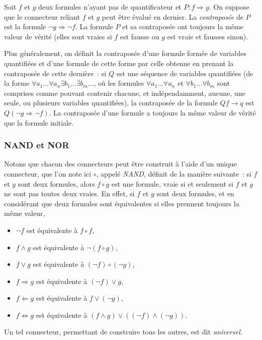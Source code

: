 Soit $f$ et $g$ deux formules n'ayant pas de quantificateur et $P: f \Rightarrow g$. 
On suppose que le connecteur reliant $f$ et $g$ peut être évalué en dernier.
La \textit{contraposée} de $P$ est la formule $\neg g \Rightarrow \neg f$. 
La formule $P$ et sa contraposée ont toujours la même valeur de vérité (elles sont vraies si $f$ est fausse ou $g$ est vraie et fausses sinon). 

Plus généralement, on définit la contraposée d'une formule formée de variables quantifiées et d'une formule de cette forme par celle obtenue en prenant la contraposée de cette dernière : si $Q$ est une séquence de variables quantifiées (de la forme $\forall a_1 \dots \forall a_n \exists b_1 \dots \exists b_m \dots$, où les formules $\forall a_1 \dots \forall a_n$ et $\forall b_1 \dots \forall b_m$ sont comprises comme pouvant contenir chacune, et indépendamment, aucune, une seule, ou plusieurs variables quantifiées), la contraposée de la formule $Q f \rightarrow q$ est $Q (\neg g \Rightarrow \neg f)$. 
La contraposée d'une formule a toujours la même valeur de vérité que la formule initiale.

\subsubsection{NAND et NOR}

Notons que chacun des connecteurs peut être construit à l'aide d'un unique connecteur, que l'on  note ici $\circ$, appelé \textit{NAND}, définit de la manière suivante : si $f$ et $g$ sont deux formules, alors $f \circ g$ est une formule, vraie si et seulement si $f$ et $g$ ne sont pas toutes deux vraies. 
En effet, si $f$ et $g$ sont deux formules, et en considérant que deux formules sont équivalentes si elles prennent toujours la même valeur,
\begin{itemize}
    \item $\neg f$ est équivalente à $f \circ f$,
    \item $f \wedge g$ est équivalente à $\neg (f \circ g)$,
    \item $f \vee g$ est équivalente à $(\neg f) \circ (\neg g)$,
    \item $f \Rightarrow g$ est équivalente à $(\neg f) \vee g$,
    \item $f \Leftarrow g$ est équivalente à $f \vee (\neg g)$,
    \item $f \Leftrightarrow g$ est équivalente à $(f \wedge g) \vee ((\neg f) \wedge (\neg g))$.
\end{itemize}
Un tel connecteur, permettant de construire tous les autres, est dit \textit{universel}.

